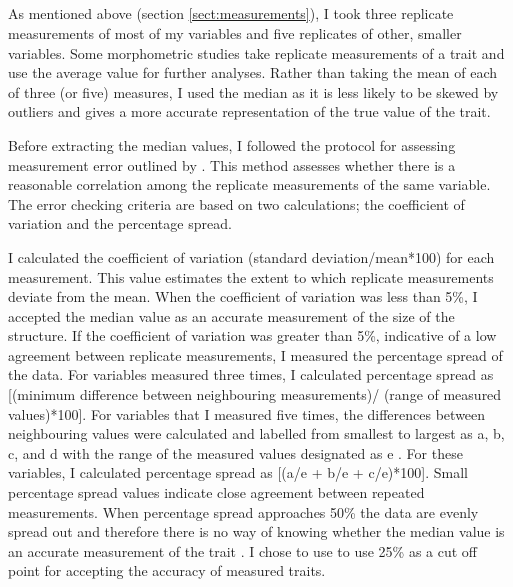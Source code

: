 \newpage
\subsection{}
	
	As mentioned above (section \ref{sect:measurements}), I took three replicate measurements of most of my variables and five replicates of other, smaller variables. 
	Some morphometric studies take replicate measurements of a trait and use the average value for further analyses. Rather than taking the mean of each of three (or five) measures, I used the median as it is less likely to be skewed by outliers and gives a more accurate representation of the true value of the trait.
	
	
	Before extracting the median values, I followed the protocol for assessing measurement error outlined by \citep{Cooper2009}. This method assesses whether there is a reasonable correlation among the replicate measurements of the same variable. The error checking criteria are based on two calculations; the coefficient of variation and the percentage spread.
	
	I calculated the coefficient of variation (standard deviation/mean*100) for each measurement. This value estimates the extent to which replicate measurements deviate from the mean. When the coefficient of variation was less than 5\%, I accepted the median value as an accurate measurement of the size of the structure. 
	If the coefficient of variation was greater than 5\%, indicative of a low agreement between replicate measurements, I measured the percentage spread of the data. For variables measured three times, I calculated percentage spread as [(minimum difference between neighbouring measurements)/ (range of measured values)*100].
	For variables that I measured five times, the differences between neighbouring values were calculated and labelled from smallest to largest as a, b, c, and d with the range of the measured values designated as e \citep{Cooper2009}. For these variables, I calculated percentage spread as [(a/e + b/e + c/e)*100]. 
	Small percentage spread values indicate close agreement between repeated measurements. When percentage spread approaches 50\% the data are evenly spread out and therefore there is no way of knowing whether the median value is an accurate measurement of the trait \citep{Cooper2009}. I chose to use to use 25\% as a cut off point for accepting the accuracy of measured traits.


